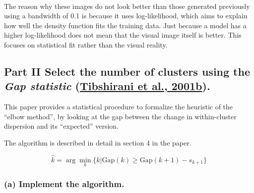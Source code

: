 \documentclass[11pt]{article}
\begin{document}
    \begin{center}
    \end{center}
    { \hspace*{\fill} \\}
    
    The reason why these images do not look better than those generated
previously using a bandwidth of 0.1 is because it uses log-likelihood,
which aims to explain how well the density function fits the training
data. Just because a model has a higher log-likelihood does not mean
that the visual image itself is better. This focuses on statistical fit
rather than the visual reality.

    \subsection{\texorpdfstring{Part II Select the number of clusters using
the \emph{Gap statistic}
(\href{hastie.su.domains/Papers/gap.pdf}{Tibshirani et al.,
2001b}).}{Part II Select the number of clusters using the Gap statistic (Tibshirani et al., 2001b).}}\label{part-ii-select-the-number-of-clusters-using-the-gap-statistic-tibshirani-et-al.-2001b.}

This paper provides a statistical procedure to formalize the heuristic
of the ``elbow method'', by looking at the gap between the change in
within-cluster dispersion and its ``expected'' version.

The algorithm is described in detail in section 4 in the paper.

\[ \widehat{k} = \arg \min_k \{k\vert \mathrm{Gap}(k) \ge \mathrm{Gap}(k + 1) - s_{k+1}\}\]

    \subsubsection{(a) Implement the
algorithm.}\label{a-implement-the-algorithm.}
\end{document}
